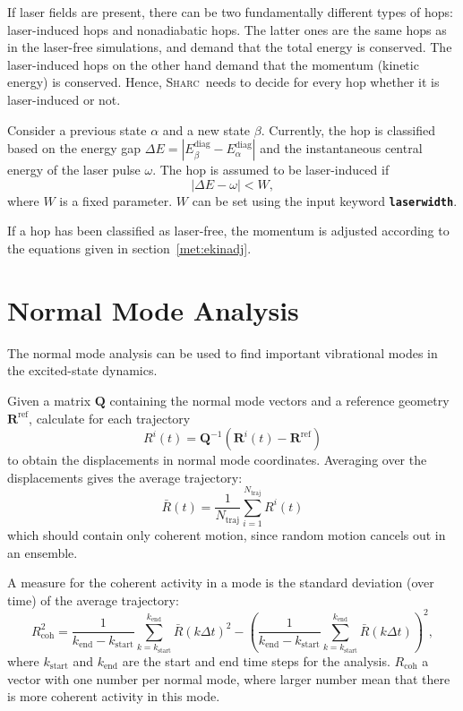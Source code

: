 \documentclass[a4paper,10pt,DIV=15,openany]{scrbook}
\newcommand{\sharc}{\textsc{Sharc}}
\newcommand{\ttt}[1]{\textbf{\texttt{#1}}}
\newcommand{\VEC}[1]{\ensuremath{\mathbf{#1}}}
\begin{document}
If laser fields are present, there can be two fundamentally different types of hops: laser-induced hops and nonadiabatic hops. The latter ones are the same hops as in the laser-free simulations, and demand that the total energy is conserved. The laser-induced hops on the other hand demand that the momentum (kinetic energy) is conserved. Hence, \sharc\ needs to decide for every hop whether it is laser-induced or not. 

Consider a previous state $\alpha$ and a new state $\beta$. Currently, the hop is classified based on the energy gap $\Delta E=|E_\beta^\text{diag}-E_\alpha^\text{diag}|$ and the instantaneous central energy of the laser pulse $\omega$. 
The hop is assumed to be laser-induced if
\begin{equation}
  |\Delta E-\omega| < W,
\end{equation}
where $W$ is a fixed parameter. $W$ can be set using the input keyword \ttt{laserwidth}.

If a hop has been classified as laser-free, the momentum is adjusted according to the equations given in section~\ref{met:ekinadj}.



\section{Normal Mode Analysis}\label{met:nma}

The normal mode analysis can be used to find important vibrational modes in the excited-state dynamics.\cite{Kurtz2001JCP,Plasser2009}

Given a matrix $\VEC{Q}$ containing the normal mode vectors and a reference geometry $\VEC{R}^\text{ref}$, calculate for each trajectory
\begin{equation}
  R^i(t)=\VEC{Q}^{-1}(\VEC{R}^i(t)-\VEC{R}^\text{ref})
\end{equation}
to obtain the displacements in normal mode coordinates.
Averaging over the displacements gives the average trajectory:
\begin{equation}
  \bar{R}(t)=\frac{1}{N_\text{traj}}
  \sum_{i=1}^{N_\text{traj}} R^i(t)
\end{equation}
which should contain only coherent motion, since random motion cancels out in an ensemble.

A measure for the coherent activity in a mode is the standard deviation (over time) of the average trajectory:
\begin{equation}
  R_\text{coh}^2=
  \frac{1}{k_\text{end}-k_\text{start}}
  \sum_{k=k_\text{start}}^{k_\text{end}} \bar{R}(k\Delta t)^2
  -
  \left(
  \frac{1}{k_\text{end}-k_\text{start}}
  \sum_{k=k_\text{start}}^{k_\text{end}} \bar{R}(k\Delta t)
  \right)^2,
\end{equation}
where $k_\text{start}$ and $k_\text{end}$ are the start and end time steps for the analysis.
$R_\text{coh}$ a vector with one number per normal mode, where larger number mean that there is more coherent activity in this mode.
\end{document}
